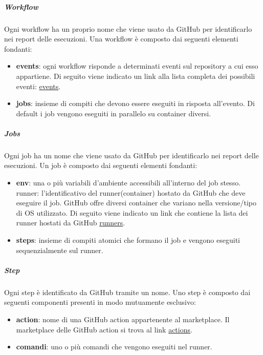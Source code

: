 \subparagraph{Workflow}
Ogni workflow ha un proprio nome che viene usato da GitHub per identificarlo nei report delle esecuzioni.
Una workflow è composto dai seguenti elementi fondanti:
\begin{itemize}
    \item \textbf{events}: ogni workflow risponde a determinati eventi sul repository a cui esso appartiene.
    Di seguito viene indicato un link alla lista completa dei possibili eventi: \href{https://docs.github.com/en/actions/writing-workflows/choosing-when-your-workflow-runs/events-that-trigger-workflows}{events}.

    \item \textbf{jobs}: insieme di compiti che devono essere eseguiti in risposta all'evento.
    Di default i job vengono eseguiti in parallelo su container diversi.
\end{itemize}

\subparagraph{Jobs}
Ogni job ha un nome che viene usato da GitHub per identificarlo nei report delle esecuzioni.
Un job è composto dai seguenti elementi fondanti:

\begin{itemize}
    \item \textbf{env}: una o più variabili d'ambiente accessibili all'interno del job stesso.
    runner: l'identificativo del runner(container) hostato da GitHub che deve eseguire il job.
    GitHub offre diversi container che variano nella versione/tipo di OS utilizzato.
    Di seguito viene indicato un link che contiene la lista dei runner hostati da GitHub \href{https://docs.github.com/en/actions/writing-workflows/workflow-syntax-for-github-actions#choosing-github-hosted-runners}{runners}. 
    \item \textbf{steps}: insieme di compiti atomici che formano il job e vengono eseguiti  sequenzialmente sul runner.
\end{itemize}

\subparagraph{Step}
Ogni step è identificato da GitHub tramite un nome.
Uno step è composto dai seguenti componenti presenti in modo mutuamente esclusivo:
\begin{itemize}
    \item \textbf{action}: nome di una GitHub action appartenente al marketplace.
    Il marketplace delle GitHub action si trova al link \href{https://github.com/marketplace?type=actions}{actions}.
    
    \item \textbf{comandi}: uno o più comandi che vengono eseguiti nel runner.
\end{itemize}

